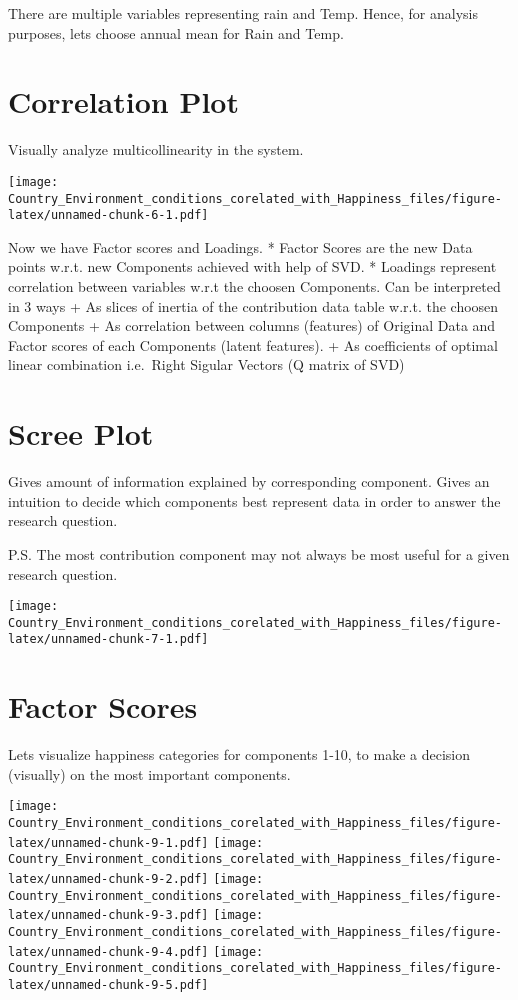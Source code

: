 \documentclass[]{book}
\begin{document}
There are multiple variables representing rain and Temp. Hence, for
analysis purposes, lets choose annual mean for Rain and Temp.

\hypertarget{correlation-plot}{%
\section{Correlation Plot}\label{correlation-plot}}

Visually analyze multicollinearity in the system.

\texttt{[image: Country\_Environment\_conditions\_corelated\_with\_Happiness\_files/figure-latex/unnamed-chunk-6-1.pdf]}

Now we have Factor scores and Loadings. * Factor Scores are the new Data
points w.r.t. new Components achieved with help of SVD. * Loadings
represent correlation between variables w.r.t the choosen Components.
Can be interpreted in 3 ways + As slices of inertia of the contribution
data table w.r.t. the choosen Components + As correlation between
columns (features) of Original Data and Factor scores of each Components
(latent features). + As coefficients of optimal linear combination
i.e.~Right Sigular Vectors (Q matrix of SVD)

\hypertarget{scree-plot}{%
\section{Scree Plot}\label{scree-plot}}

Gives amount of information explained by corresponding component. Gives
an intuition to decide which components best represent data in order to
answer the research question.

P.S. The most contribution component may not always be most useful for a
given research question.

\texttt{[image: Country\_Environment\_conditions\_corelated\_with\_Happiness\_files/figure-latex/unnamed-chunk-7-1.pdf]}

\hypertarget{factor-scores}{%
\section{Factor Scores}\label{factor-scores}}

Lets visualize happiness categories for components 1-10, to make a
decision (visually) on the most important components.

\texttt{[image: Country\_Environment\_conditions\_corelated\_with\_Happiness\_files/figure-latex/unnamed-chunk-9-1.pdf]}
\texttt{[image: Country\_Environment\_conditions\_corelated\_with\_Happiness\_files/figure-latex/unnamed-chunk-9-2.pdf]}
\texttt{[image: Country\_Environment\_conditions\_corelated\_with\_Happiness\_files/figure-latex/unnamed-chunk-9-3.pdf]}
\texttt{[image: Country\_Environment\_conditions\_corelated\_with\_Happiness\_files/figure-latex/unnamed-chunk-9-4.pdf]}
\texttt{[image: Country\_Environment\_conditions\_corelated\_with\_Happiness\_files/figure-latex/unnamed-chunk-9-5.pdf]}
\end{document}
